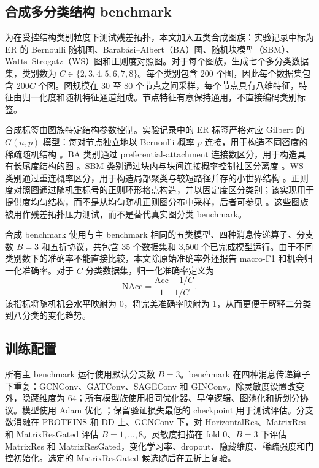 \documentclass[UTF8,10pt]{ctexart}
\let\cite\citep
\begin{document}
\subsection{合成多分类结构 benchmark}
\label{sec:synthetic_zh}

为在受控结构类别粒度下测试残差拓扑，本文加入五类合成图族：实验记录中标为 ER 的 Bernoulli 随机图、Barabási--Albert（BA）图、随机块模型（SBM）、Watts--Strogatz（WS）图和正则度对照图。对于每个图族，生成七个多分类数据集，类别数为 \(C\in\{2,3,4,5,6,7,8\}\)。每个类别包含 200 个图，因此每个数据集包含 \(200C\) 个图。图规模在 30 至 80 个节点之间采样，每个节点具有八维特征，特征由归一化度和随机特征通道组成。节点特征有意保持通用，不直接编码类别标签。

合成标签由图族特定结构参数控制。实验记录中的 ER 标签严格对应 Gilbert 的 \(G(n,p)\) 模型：每对节点独立地以 Bernoulli 概率 \(p\) 连接，用于构造不同密度的稀疏随机结构 \cite{gilbert1959random}。BA 类别通过 preferential-attachment 连接数区分，用于构造具有长尾度结构的图 \cite{barabasi1999emergence}。SBM 类别通过块内与块间连接概率控制社区分离度 \cite{holland1983stochastic}。WS 类别通过重连概率区分，用于构造局部聚类与较短路径并存的小世界结构 \cite{watts1998collective}。正则度对照图通过随机重标号的正则环形格点构造，并以固定度区分类别；该实现用于提供度均匀结构，而不是从均匀随机正则图分布中采样，后者可参见 \cite{wormald1999models}。这些图族被用作残差拓扑压力测试，而不是替代真实图分类 benchmark。

合成 benchmark 使用与主 benchmark 相同的五类模型、四种消息传递算子、分支数 \(B=3\) 和五折协议，共包含 35 个数据集和 3,500 个已完成模型运行。由于不同类别数下的准确率不能直接比较，本文除原始准确率外还报告 macro-F1 和机会归一化准确率。对于 \(C\) 分类数据集，归一化准确率定义为
\begin{equation}
\mathrm{NAcc}=\frac{\mathrm{Acc}-1/C}{1-1/C}.
\end{equation}
该指标将随机机会水平映射为 0，将完美准确率映射为 1，从而更便于解释二分类到八分类的变化趋势。

\subsection{训练配置}

所有主 benchmark 运行使用默认分支数 \(B=3\)。benchmark 在四种消息传递算子下重复：GCNConv、GATConv、SAGEConv 和 GINConv。除灵敏度设置改变外，隐藏维度为 64；所有模型族使用相同优化器、早停逻辑、图池化和折划分协议。模型使用 Adam 优化 \cite{kingma2014adam}；保留验证损失最低的 checkpoint 用于测试评估。分支数消融在 PROTEINS 和 DD 上、GCNConv 下，对 HorizontalRes、MatrixRes 和 MatrixResGated 评估 \(B=1,\ldots,8\)。灵敏度扫描在 fold 0、\(B=3\) 下评估 MatrixRes 和 MatrixResGated，变化学习率、dropout、隐藏维度、稀疏强度和门控初始化。选定的 MatrixResGated 候选随后在五折上复验。
\end{document}
